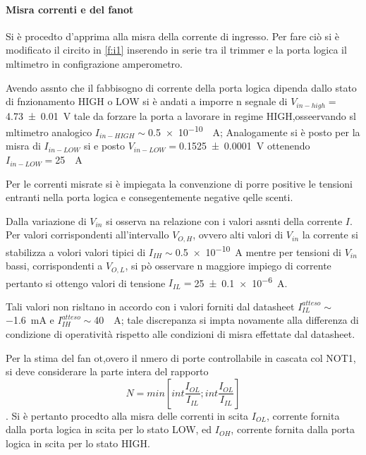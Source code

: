 \paragraph{Misra correnti e del fanot}
	Si è procedto d'apprima alla misra della corrente di ingresso.
	Per fare ciò si è modificato il circito in \figurename{ \ref{f:i1}} inserendo in serie tra il trimmer e la porta logica il mltimetro in configrazione amperometro.
	
	Avendo assnto che il fabbisogno di corrente della porta logica dipenda 	dallo stato di fnzionamento HIGH o LOW
	si è andati a imporre n segnale di $V_{in-high}=$\SI{4.73\pm 0.01}{\volt} tale da forzare la porta a lavorare in regime HIGH,osseervando sl mltimetro analogico $I_{in-HIGH}\sim$\SI{0.5e-10}{\mu \ampere};
	Analogamente si è posto per la misra di  $I_{in-LOW}$ si e posto  $V_{in-LOW}=$\SI{0.1525\pm 0.0001}{\volt} ottenendo $I_{in-LOW}=$\SI{25}{\mu \ampere}
	
	
	Per le correnti misrate si è impiegata la convenzione di porre positive le tensioni entranti nella porta  logica e consegentemente negative qelle scenti.
	
	Dalla variazione di  $V_{in}$ si osserva na relazione con i valori assnti della corrente $I$.
	Per valori corrispondenti all'intervallo $V_{O,H}$, ovvero alti valori di 	$V_{in}$
	la corrente si stabilizza a volori valori tipici di $I_{IH}\sim$\SI{0.5 e-10}{\ampere}
	mentre per tensioni di $V_{in}$ bassi, corrispondenti a $V_{O,L}$, si pò
	osservare n maggiore impiego di corrente pertanto si ottengo valori di tensione $I_{IL}=$\SI{25 \pm 0.1 e-6}{\ampere}.
	
	Tali valori non risltano in accordo con i valori forniti dal datasheet 
	$I_{IL}^{atteso}\sim$\SI{-1.6}{\milli \ampere} e $I_{IH}^{atteso}\sim$\SI{40}{\mu \ampere}; tale discrepanza si impta novamente alla differenza di condizione di operatività rispetto alle condizioni di misra effettate dal datasheet.
	
	Per la stima del fan ot,overo il nmero di porte controllabile in cascata col NOT1, si deve considerare la parte intera del rapporto \begin{equation}
	N=min[int \frac{I_{OL}}{I_{IL}};int \frac{I_{OL}}{I_{IL}}]
		\end{equation}\label{eq:fan-o}
		.
	Si è pertanto procedto alla misra delle correnti in scita $I_{OL}$, corrente fornita dalla porta logica in scita per lo stato LOW, ed $I_{OH}$, corrente fornita dalla porta logica in scita per lo stato HIGH.
	

